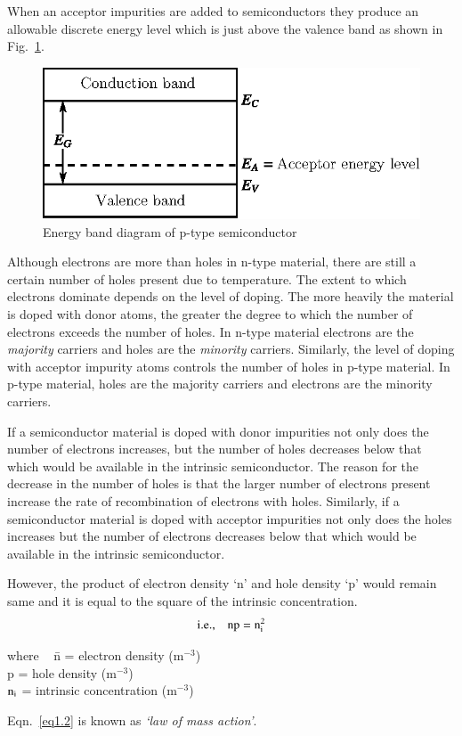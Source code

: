When an acceptor impurities are added to semiconductors they produce an allowable discrete energy level which is just above the valence band as shown in Fig.~\ref{fig1.14}.
\begin{figure}[H]
\centering
\includegraphics[scale=.93]{chap1/fig1.14.eps}
\caption{Energy band diagram of p-type semiconductor}\label{fig1.14}
\end{figure}

Although electrons are more than holes in n-type material, there are still a certain number of holes present due to temperature. The extent to which electrons dominate depends on the level of doping. The more heavily the material is doped with donor atoms, the greater the degree to which the number of electrons exceeds the number of holes. In n-type material electrons are the {\em majority} carriers and holes are the {\em minority} carriers. Similarly, the level of doping with acceptor impurity atoms controls the number of holes in p-type material. In p-type material, holes are the majority carriers and electrons are the minority carriers.

If a semiconductor material is doped with donor impurities not only does the number of electrons increases, but the number of holes decreases below that which would be available in the intrinsic semiconductor. The reason for the decrease in the number of holes is that the larger number of electrons present increase the rate of recombination of electrons with holes. Similarly, if a semiconductor material is doped with acceptor impurities not only does the holes increases but the number of electrons decreases below that which would be available in the intrinsic semiconductor.

However, the product of electron density `n' and hole density `p' would remain same and it is equal to the square of the intrinsic concentration.
\begin{equation}
\text{i.e.,}\quad \textrm{n}\textrm{p}=\textrm{n}^{2}_{\textrm{i}}\label{eq1.2}
\end{equation}
\begin{tabbing}
where ~ \= n = electron density (m$^{-3}$)\\[3pt]
        \> p = hole density (m$^{-3}$)\\[3pt]
        \> $\textrm{n}_{\textrm{i}}$ = intrinsic concentration (m$^{-3}$) 
\end{tabbing}
\noindent
Eqn.~\eqref{eq1.2} is known as {\em `law of mass action'}.

